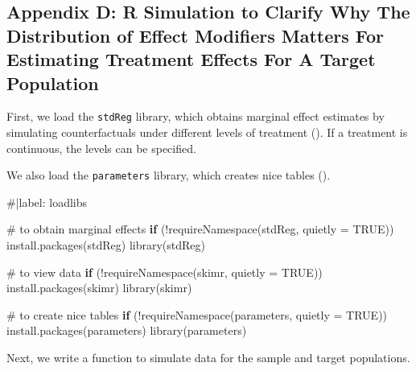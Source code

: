 \documentclass[
  single column]{article}
\newenvironment{Shaded}{\begin{snugshade}}{\end{snugshade}}
\newcommand{\AttributeTok}[1]{\textcolor[rgb]{0.40,0.45,0.13}{#1}}
\newcommand{\CommentTok}[1]{\textcolor[rgb]{0.37,0.37,0.37}{#1}}
\newcommand{\ConstantTok}[1]{\textcolor[rgb]{0.56,0.35,0.01}{#1}}
\newcommand{\ControlFlowTok}[1]{\textcolor[rgb]{0.00,0.23,0.31}{\textbf{#1}}}
\newcommand{\FunctionTok}[1]{\textcolor[rgb]{0.28,0.35,0.67}{#1}}
\newcommand{\NormalTok}[1]{\textcolor[rgb]{0.00,0.23,0.31}{#1}}
\newcommand{\SpecialCharTok}[1]{\textcolor[rgb]{0.37,0.37,0.37}{#1}}
\newcommand{\StringTok}[1]{\textcolor[rgb]{0.13,0.47,0.30}{#1}}
\begin{document}
\subsection{Appendix D: R Simulation to Clarify Why The Distribution of
Effect Modifiers Matters For Estimating Treatment Effects For A Target
Population}\label{id-app-d}

First, we load the \texttt{stdReg} library, which obtains marginal
effect estimates by simulating counterfactuals under different levels of
treatment (). If a
treatment is continuous, the levels can be specified.

We also load the \texttt{parameters} library, which creates nice tables
().

\begin{Shaded}
\begin{Highlighting}[]
\CommentTok{\#|label: loadlibs}

\CommentTok{\# to obtain marginal effects}
\ControlFlowTok{if}\NormalTok{ (}\SpecialCharTok{!}\FunctionTok{requireNamespace}\NormalTok{(}\StringTok{\textquotesingle{}stdReg\textquotesingle{}}\NormalTok{, }\AttributeTok{quietly =} \ConstantTok{TRUE}\NormalTok{)) }\FunctionTok{install.packages}\NormalTok{(}\StringTok{\textquotesingle{}stdReg\textquotesingle{}}\NormalTok{)}
\FunctionTok{library}\NormalTok{(stdReg)}

\CommentTok{\#  to view data}
\ControlFlowTok{if}\NormalTok{ (}\SpecialCharTok{!}\FunctionTok{requireNamespace}\NormalTok{(}\StringTok{\textquotesingle{}skimr\textquotesingle{}}\NormalTok{, }\AttributeTok{quietly =} \ConstantTok{TRUE}\NormalTok{)) }\FunctionTok{install.packages}\NormalTok{(}\StringTok{\textquotesingle{}skimr\textquotesingle{}}\NormalTok{)}
\FunctionTok{library}\NormalTok{(skimr)}

\CommentTok{\# to create nice tables}
\ControlFlowTok{if}\NormalTok{ (}\SpecialCharTok{!}\FunctionTok{requireNamespace}\NormalTok{(}\StringTok{\textquotesingle{}parameters\textquotesingle{}}\NormalTok{, }\AttributeTok{quietly =} \ConstantTok{TRUE}\NormalTok{)) }\FunctionTok{install.packages}\NormalTok{(}\StringTok{\textquotesingle{}parameters\textquotesingle{}}\NormalTok{)}
\FunctionTok{library}\NormalTok{(parameters)}
\end{Highlighting}
\end{Shaded}

Next, we write a function to simulate data for the sample and target
populations.
\end{document}
